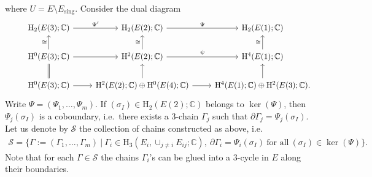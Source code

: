 where \(U=E\setminus E_{\mathrm{sing}}\).
Consider the dual diagram
\begin{eqnarray*}
\begin{tikzcd}
&\mathrm{H}_{2}(E(3);\mathbb{C})\ar[r,"\Psi'"]
&\mathrm{H}_{2}(E(2);\mathbb{C})\ar[r,"\Psi"]
&\mathrm{H}_{2}(E(1);\mathbb{C})\\
&\mathrm{H}^{0}(E(3);\mathbb{C})\ar[u,"\cong"]\ar[r]\ar[d,equal]
&\mathrm{H}^{2}(E(2);\mathbb{C})\ar[u,"\cong"]\ar[r,"\psi"]
&\mathrm{H}^{4}(E(1);\mathbb{C})\ar[u,"\cong"]\\
&\mathrm{H}^{0}(E(3);\mathbb{C})\ar[r]
&\mathrm{H}^{2}(E(2);\mathbb{C})\oplus\mathrm{H}^{0}(E(4);\mathbb{C})\ar[r]\ar[u]
&\mathrm{H}^{4}(E(1);\mathbb{C})\oplus\mathrm{H}^{2}(E(3);\mathbb{C}).\ar[u]
\end{tikzcd}
\end{eqnarray*}
Write \(\Psi=(\Psi_{1},\ldots,\Psi_{m})\).
If \((\sigma_{I})\in \mathrm{H}_{2}(E(2);\mathbb{C})\)
belongs to \(\operatorname{ker}(\Psi)\), then
\(\Psi_{j}(\sigma_{I})\) is a coboundary, i.e.~there exists a
\(3\)-chain \(\Gamma_{j}\) such that 
\(\partial\Gamma_{j}=\Psi_{j}(\sigma_{I})\).
Let us denote by \(\mathcal{S}\) the collection of
chains constructed as above, i.e.~
\begin{eqnarray*}
\mathcal{S}=\{\Gamma:=(\Gamma_{1},\ldots,\Gamma_{m})~|~\Gamma_{i}\in \mathrm{H}_{3}(E_{i},\cup_{j\ne i}E_{ij};\mathbb{C}),~\partial\Gamma_{i}=\Psi_{i}(\sigma_{I})~\mbox{for all}~
(\sigma_{I})\in\operatorname{ker}(\Psi)\}.
\end{eqnarray*}
Note that for each \(\Gamma\in\mathcal{S}\) the chains \(\Gamma_{i}\)'s can
be glued into a \(3\)-cycle in \(E\) along their boundaries.

